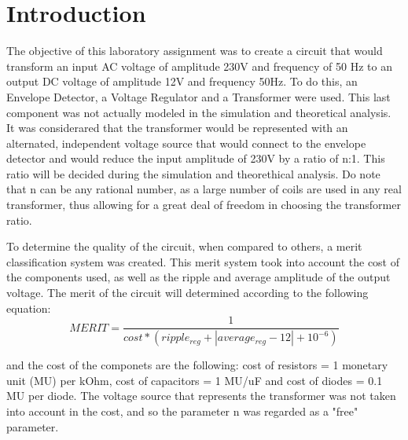 \section{Introduction}
\label{sec:introduction}


\par The objective of this laboratory assignment was to create a circuit that would transform an input AC voltage of amplitude 230V and frequency of 50 Hz to an output DC voltage of amplitude 12V and frequency 50Hz. To do this, an Envelope Detector, a Voltage Regulator and a Transformer were used. This last component was not actually modeled in the simulation and theoretical analysis. It was considerared that the transformer would be represented with an alternated, independent voltage source that would connect to the envelope detector and would reduce the input amplitude of 230V by a ratio of n:1. This ratio will be decided during the simulation and theorethical analysis. Do note that n can be any rational number, as a large number of coils are used in any real transformer, thus allowing for a great deal of freedom in choosing the transformer ratio.\par
To determine the quality of the circuit, when compared to others, a merit classification system was created. This merit system took into account the cost of the components used, as well as the ripple and average amplitude of the output voltage. The merit of the circuit will determined according to the following equation: 
\begin {equation}
	 MERIT = \frac{1}{cost*(ripple_{reg} + |average_{reg} - 12| + 10^{-6})}   	
	\label{eq:i1}
\end{equation}

and the cost of the componets are the following: cost of resistors = 1 monetary unit (MU) per kOhm, cost of capacitors = 1 MU/uF
and cost of diodes = 0.1 MU per diode. The voltage source that represents the transformer was not taken into account in the cost, and so the parameter n was regarded as a "free" parameter.
 
